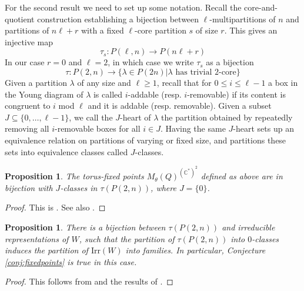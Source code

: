 \documentclass{amsart}
\numberwithin{equation}{section}
\newtheorem{proposition}[lemma]{Proposition}%
\theoremstyle{definition}
\newcommand{\C}{{\mathbb C}}
\begin{document}
For the second result we need to set up some notation. Recall the core-and-quotient construction establishing a bijection between $\ell$-multipartitions of $n$ and partitions of $n\ell+r$ with a fixed $\ell$-core partition $s$ of size $r$. This gives an injective map $$\tau_s: P(\ell,n)\to P(n\ell+r)$$
In our case $r=0$ and $\ell=2$, in which case we write $\tau_s$ as a bijection 
$$\tau: P(2,n)\to \{\lambda\in P(2n)|\lambda \text{ has trivial $2$-core}\}$$
Given a partition $\lambda$ of any size and $\ell\geq 1$, recall that for $0\leq i\leq \ell-1$ a box in the Young diagram of $\lambda$ is called $i$-addable (resp. $i$-removable) if its content is congruent to $i$ mod $\ell$ and it is addable (resp. removable). Given a subset $J\subseteq \{0,\ldots,\ell-1\}$, we call the $J$-heart of $\lambda$ the partition obtained by repeatedly removing all $i$-removable boxes for all $i\in J$. Having the same $J$-heart sets up an equivalence relation on partitions of varying or fixed size, and partitions these sets into equivalence classes called $J$-classes.
\begin{proposition}
\label{prop:jclasses}
The torus-fixed points $M_\theta(Q)^{(\C^*)^2}$ defined as above are in bijection with $J$-classes in $\tau(P(2,n))$, where $J=\{0\}$.
\end{proposition}
\begin{proof}
This is \cite[Proposition 8.3.]{GordonO}. See also \cite[Corollary 10.4 and Remark 10.5]{Pre}.
\end{proof}
\begin{proposition}
    There is a bijection between $\tau(P(2,n))$ and irreducible representations of $W$, such that the partition of $\tau(P(2,n))$ into $0$-classes induces the partition of $\text{Irr}(W)$ into families. In particular, Conjecture \ref{conj:fixedpoints} is true in this case.
\end{proposition}
\begin{proof}
This follows from \cite[Theorem 3.3.]{GordonMartino} and the results of \cite{Garfinkle}.
\end{proof}
\end{document}
